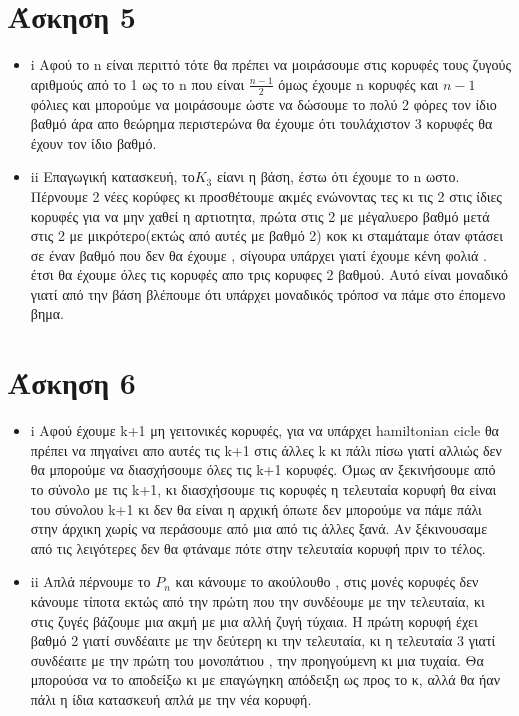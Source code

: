 \documentclass{article}
\begin{document}
\section*{Άσκηση 5}
\begin{itemize} \item i
Αφού το n είναι περιττό  τότε θα πρέπει να μοιράσουμε στις κορυφές τους ζυγούς αριθμούς από το 1 ως το n που είναι $\frac{n -1} {2}$ όμως έχουμε n κορυφές και $n-1$ φόλιες και μπορούμε να μοιράσουμε ώστε να δώσουμε το πολύ 2 φόρες τον ίδιο βαθμό άρα απο θεώρημα περιστερώνα θα έχουμε ότι τουλάχιστον 3 κορυφές θα έχουν τον ίδιο βαθμό.
\item ii
Επαγωγική κατασκευή, το$ K_3$ είανι η βάση, έστω ότι έχουμε το n ωστο. Πέρνουμε 2 νέες κορύφες κι προσθέτουμε ακμές ενώνοντας τες κι τις 2 στις ίδιες κορυφές για να μην χαθεί η αρτιοτητα, πρώτα στις 2 με μέγαλυερο βαθμό μετά στις 2 με μικρότερο(εκτώς από αυτές με βαθμό 2) κοκ κι σταμάταμε όταν φτάσει σε έναν βαθμό που δεν θα έχουμε , σίγουρα υπάρχει γιατί έχουμε κένη φολιά . έτσι θα έχουμε όλες τις κορυφές  απο τρις κορυφες 2 βαθμού. Αυτό είναι μοναδικό γιατί από την βάση βλέπουμε ότι υπάρχει μοναδικός τρόποσ να πάμε στο έπομενο βημα. 
\end{itemize} 
\section*{Άσκηση 6}
\begin{itemize} \item i
Αφού έχουμε k+1 μη γειτονικές κορυφές, για να υπάρχει hamiltonian cicle θα πρέπει να πηγαίνει απο αυτές τις k+1 στις άλλες k κι πάλι πίσω γιατί αλλιώς δεν θα μπορούμε να διασχήσουμε όλες τις k+1 κορυφές. Όμως αν ξεκινήσουμε από το σύνολο με τις k+1, κι διασχήσουμε τις κορυφές η τελευταία κορυφή θα είναι του σύνολου k+1 κι δεν θα είναι η αρχική όπωτε δεν μπορούμε να πάμε πάλι στην άρχικη χωρίς να περάσουμε από μια από τις άλλες ξανά. Αν ξέκινουσαμε από τις λειγότερες δεν θα φτάναμε πότε στην τελευταία κορυφή πριν το τέλος.
\item ii
Απλά πέρνουμε το $P_n $ και κάνουμε το ακούλουθο , στις μονές κορυφές δεν κάνουμε τίποτα εκτώς από την πρώτη που την συνδέουμε με την τελευταία, κι στις ζυγές βάζουμε μια ακμή με μια αλλή ζυγή τύχαια. Η πρώτη κορυφή έχει βαθμό 2 γιατί συνδέαιτε με την δεύτερη κι την τελευταία, κι η τελευταία 3 γιατί συνδέαιτε με την πρώτη του μονοπάτιου , την προηγούμενη κι μια τυχαία. Θα μπορούσα να το αποδείξω κι με επαγώγηκη απόδειξη ως προς το κ, αλλά θα ήαν πάλι η ίδια κατασκευή απλά με την νέα κορυφή.
\end{itemize}
\end{document}
